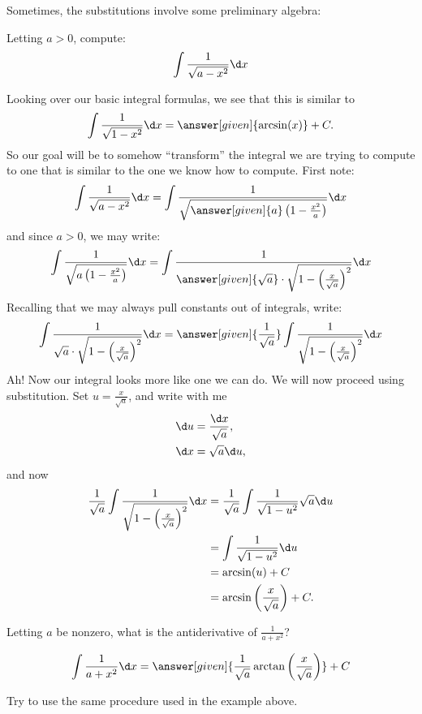 \documentclass[nooutcomes]{ximera}
\begin{document}
Sometimes, the substitutions involve some preliminary algebra:

\begin{example} 

  Letting $a>0$, compute:
  \[
  \int \frac{1}{\sqrt{a-x^2}} \d x
  \]
  \begin{explanation}
    Looking over our basic integral formulas, we see that this is similar to
    \[
    \int \frac{1}{\sqrt{1-x^2}}\d x= \answer[given]{\arcsin(x)}+C.
    \]
    So our goal will be to somehow ``transform'' the integral we are
    trying to compute to one that is similar to the one we know how to
    compute. First note:
    \[
    \int \frac{1}{\sqrt{a-x^2}} \d x  =
    \int \frac{1}{\sqrt{\answer[given]{a}\left(1-\frac{x^2}{a}\right)}} \d x
    \]
    and since $a>0$, we may write:
    \[
    \int \frac{1}{\sqrt{a\left(1-\frac{x^2}{a}\right)}} \d x=
    \int \frac{1}{\answer[given]{\sqrt{a}}\cdot \sqrt{1-\left(\frac{x}{\sqrt{a}}\right)^2}} \d x
    \]
    Recalling that we may always pull constants out of integrals, write:
    \[
    \int \frac{1}{\sqrt{a}\cdot \sqrt{1-\left(\frac{x}{\sqrt{a}}\right)^2}} \d x = 
    \answer[given]{\frac{1}{\sqrt{a}}}\int \frac{1}{\sqrt{1-\left(\frac{x}{\sqrt{a}}\right)^2}} \d x 
    \]
    Ah! Now our integral looks more like one we can do. We will now
    proceed using substitution. Set $u = \frac{x}{\sqrt{a}}$, and write with me
    \begin{align*}
      \d u &= \frac{\d x}{\sqrt{a}},\\
      \d x &= \sqrt{a}\d u,
    \end{align*}
    and now
    \begin{align*}
    \frac{1}{\sqrt{a}}\int \frac{1}{\sqrt{1-\left(\frac{x}{\sqrt{a}}\right)^2}} \d x &=
    \frac{1}{\sqrt{a}}\int \frac{1}{\sqrt{1-u^2}} \sqrt{a} \d u\\
    &=\int \frac{1}{\sqrt{1-u^2}}\d u\\
    &=\arcsin(u) + C\\
    &=\arcsin\left(\frac{x}{\sqrt{a}}\right) + C.
    \end{align*}
  \end{explanation}
\end{example}




\begin{question}
  Letting $a$ be nonzero, what is the antiderivative of $\frac{1}{a +
    x^2}$?
  \begin{prompt}
    \[
    \int \frac{1}{a + x^2} \d x = \answer[given]{\frac{1}{\sqrt{a}} \arctan\left(\frac{x}{\sqrt{a}}\right)}+C
    \]
  \end{prompt}
  \begin{hint}
    Try to use the same procedure used in the example above.
  \end{hint}
\end{question}
\end{document}
